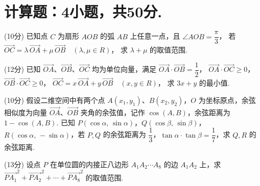 \documentclass[12pt, a4paper]{article}
\begin{document}
\section{计算题：4小题，共50分. }
\begin{question}[resume]
    \item (10分) 已知点 $C$ 为扇形 $AOB$ 的弧 $AB$ 上任意一点，且 $\angle AOB = \dfrac{\pi}{3}$，
    若 $\overrightarrow{OC} = \lambda\,\overrightarrow{OA} + \mu\,\overrightarrow{OB} \quad (\lambda,\mu \in R)$，
    求 $\lambda + \mu$ 的取值范围. 
    \vspace*{5em}\vspace*{5em}\vspace*{5em}\vspace*{5em}\vspace*{5em}
    

    \item (12分) 已知 $\overrightarrow{OA}$、$\overrightarrow{OB}$、$\overrightarrow{OC}$ 均为单位向量，满足 $\overrightarrow{OA} \cdot \overrightarrow{OB} = \dfrac{1}{2}$，
    $\overrightarrow{OA} \cdot \overrightarrow{OC} \ge 0$，
    $\overrightarrow{OB} \cdot \overrightarrow{OC} \ge 0$，
    $\overrightarrow{OC} = x\,\overrightarrow{OA} + y\,\overrightarrow{OB} \quad (x,y \in R)$，
    求 $3x + y$ 的最小值. 
     \vspace*{5em}\vspace*{5em}\vspace*{5em}\vspace*{5em}\vspace*{5em}

    \item (10分) 假设二维空间中有两个点 $A(x_{1},y_{1})$、$B(x_{2},y_{2})$，$O$ 为坐标原点，余弦相似度为向量 $\overrightarrow{OA}$、$\overrightarrow{OB}$ 夹角的余弦值，记作 $\cos(A,B)$，余弦距离为 $1 - \cos(A,B)$. 已知 $P(\cos\alpha,\,\sin\alpha)$，$Q(\cos\beta,\,\sin\beta)$，$R(\cos\alpha,\,-\sin\alpha)$，若 $P,Q$ 的余弦距离为 $\dfrac{1}{3}$，$\tan\alpha \cdot \tan\beta = \dfrac{1}{7}$，求 $Q,R$ 的余弦距离. 
\vspace*{20em}\vspace*{5em}
\item (13分) 设点 $P$ 在单位圆的内接正八边形 $A_{1}A_{2}\cdots A_{8}$ 的边 $A_{1}A_{2}$ 上，求 $\overrightarrow{PA_{1}}^{2} + \overrightarrow{PA_{2}}^{2} + \cdots + \overrightarrow{PA_{8}}^{2}$
的取值范围. 


    
\end{question}
\end{document}
